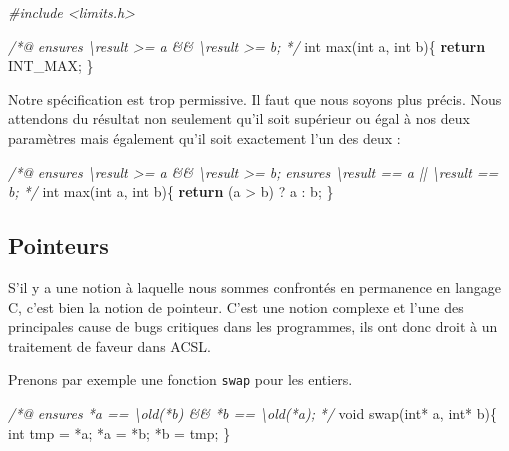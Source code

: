 \documentclass[12pt,francais,]{scrbook}
\newenvironment{Shaded}{}{}
\newcommand{\KeywordTok}[1]{\textcolor[rgb]{0.00,0.44,0.13}{\textbf{{#1}}}}
\newcommand{\DataTypeTok}[1]{\textcolor[rgb]{0.56,0.13,0.00}{{#1}}}
\newcommand{\CommentTok}[1]{\textcolor[rgb]{0.38,0.63,0.69}{\textit{{#1}}}}
\newcommand{\NormalTok}[1]{{#1}}
\begin{document}
\begin{footnotesize}\begin{Shaded}
\begin{Highlighting}[]
\CommentTok{#include <limits.h>}

\CommentTok{/*@}
\CommentTok{  ensures \textbackslash{}result >= a && \textbackslash{}result >= b;}
\CommentTok{*/}
\DataTypeTok{int} \NormalTok{max(}\DataTypeTok{int} \NormalTok{a, }\DataTypeTok{int} \NormalTok{b)\{}
  \KeywordTok{return} \NormalTok{INT_MAX;}
\NormalTok{\}}
\end{Highlighting}
\end{Shaded}\end{footnotesize}

Notre spécification est trop permissive. Il faut que nous soyons plus
précis. Nous attendons du résultat non seulement qu'il soit supérieur ou
égal à nos deux paramètres mais également qu'il soit exactement l'un des
deux :

\begin{footnotesize}\begin{Shaded}
\begin{Highlighting}[]
\CommentTok{/*@}
\CommentTok{  ensures \textbackslash{}result >= a && \textbackslash{}result >= b;}
\CommentTok{  ensures \textbackslash{}result == a || \textbackslash{}result == b;}
\CommentTok{*/}
\DataTypeTok{int} \NormalTok{max(}\DataTypeTok{int} \NormalTok{a, }\DataTypeTok{int} \NormalTok{b)\{}
  \KeywordTok{return} \NormalTok{(a > b) ? a : b;}
\NormalTok{\}}
\end{Highlighting}
\end{Shaded}\end{footnotesize}

\subsection{Pointeurs}\label{pointeurs}

S'il y a une notion à laquelle nous sommes confrontés en permanence en
langage C, c'est bien la notion de pointeur. C'est une notion complexe
et l'une des principales cause de bugs critiques dans les programmes,
ils ont donc droit à un traitement de faveur dans ACSL.

Prenons par exemple une fonction \texttt{swap} pour les entiers.

\clearpage

\begin{footnotesize}\begin{Shaded}
\begin{Highlighting}[]
\CommentTok{/*@}
\CommentTok{  ensures *a == \textbackslash{}old(*b) && *b == \textbackslash{}old(*a);}
\CommentTok{*/}
\DataTypeTok{void} \NormalTok{swap(}\DataTypeTok{int}\NormalTok{* a, }\DataTypeTok{int}\NormalTok{* b)\{}
  \DataTypeTok{int} \NormalTok{tmp = *a;}
  \NormalTok{*a = *b;}
  \NormalTok{*b = tmp;}
\NormalTok{\}}
\end{Highlighting}
\end{Shaded}\end{footnotesize}
\end{document}
